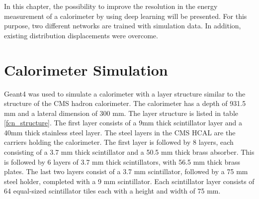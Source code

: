 \documentclass[12pt, a4paper]{thesis}
\begin{document}
\begin{figure}[H]
  \centering
  \caption{}
  \label{calo-analysis-flow}
\end{figure}


In this chapter, the possibility to improve the resolution in the
energy measurement of a calorimeter by using deep learning will be
presented. For this purpose, two different networks are trained with
simulation data. In addition, existing distribution displacements were
overcome.

\section{Calorimeter Simulation}
\label{sec:org905cdeb}

Geant4 \cite{geant_simul_toolk} was used to simulate a calorimeter
with a layer structure similar to the structure of the CMS hadron
calorimeter. The calorimeter has a depth of 931.5 mm and a lateral
dimension of 300 mm. The layer structure is listed in table
\ref{fcn_structure}. The first layer consists of a 9mm thick
scintillator layer and a 40mm thick stainless steel layer. The steel
layers in the CMS HCAL are the carriers holding the calorimeter. The
first layer is followed by 8 layers, each consisting of a 3.7 mm thick
scintillator and a 50.5 mm thick brass absorber. This is followed by 6
layers of 3.7 mm thick scintillators, with 56.5 mm thick brass plates.
The last two layers consist of a 3.7 mm scintillator, followed by a 75
mm steel holder, completed with a 9 mm scintillator. Each scintillator
layer consists of 64 equal-sized scintillator tiles each with a height
and width of 75 mm.
\end{document}
